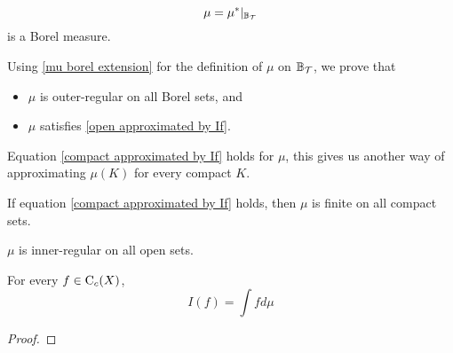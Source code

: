 \documentclass[../../main.tex]{subfiles}
\begin{document}
\begin{enumalpha}
    \begin{equation}
    \mu = \mu^*|_{\mathbb{B}_{\mathcal{T}}}\label{mu borel extension}
    \end{equation} 
    is a Borel measure.
%
%
    \item Using \eqref{mu borel extension} for the definition of  $\mu$ on $\mathbb{B}_{\mathcal{T}}$, we prove that
    \begin{itemize}
        \item $\mu$ is outer-regular on all Borel sets, and
        \item $\mu$ satisfies \eqref{open approximated by If}.
    \end{itemize}
%
%
    \item Equation \eqref{compact approximated by If} holds for $\mu$, this gives us another way of approximating $\mu(K)$ for every compact $K$.
%
%
    \item If equation \eqref{compact approximated by If} holds, then $\mu$ is finite on all compact sets.
%
%
    \item $\mu$ is inner-regular on all open sets.
%
%
    \item For every $f\in\operatorname{C}_c({X})$, 
    \[
    I(f) = \int fd\mu
    \]
\end{enumalpha}
\begin{proof}
    
\end{proof}
\end{document}
